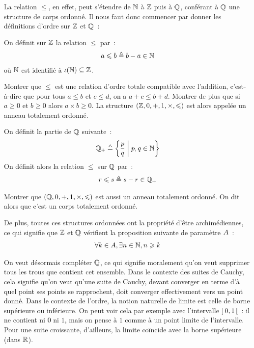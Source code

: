 La relation $\leq$, en effet, peut s'étendre de $\mathbb N$ à $\mathbb Z$ puis à $\mathbb Q$,
conférant à $\mathbb Q$ une structure de corps ordonné. Il nous faut donc commencer
par donner les définitions d'ordre sur $\mathbb Z$ et $\mathbb Q$~:

\begin{definition}
  On définit sur $\mathbb Z$ la relation $\leq$ par~:
  \[a \leqslant b \triangleq b - a \in \mathbb N\]
  où $\mathbb N$ est identifié à $\iota(\mathbb N) \subseteq \mathbb Z$.
\end{definition}

\begin{exercise}
  Montrer que $\leq$ est une relation d'ordre totale compatible avec l'addition,
  c'est-à-dire que pour tous $a\leq b$ et $c\leq d$, on a $a+c\leq b+d$.
  Montrer de plus que si $a \geq 0$ et $b\geq 0$ alors $a\times b \geq 0$.
  La structure $(\mathbb Z,0,+,1,\times,\leqslant)$ est alors appelée un anneau
  totalement ordonné.
\end{exercise}

\begin{definition}
  On définit la partie de $\mathbb Q$ suivante~:
  \[\mathbb Q_+ \triangleq \left\{ \frac{p}{q} \;\middle\vert\; p,q\in \mathbb N \right\}\]
  On définit alors la relation $\leq$ sur $\mathbb Q$ par~:
  \[r \leqslant s \triangleq s - r \in \mathbb Q_+\]
\end{definition}

\begin{exercise}
  Montrer que $(\mathbb Q,0,+,1,\times,\leqslant)$ est aussi un anneau totalement
  ordonné. On dit alors que c'est un corps totalement ordonné.
\end{exercise}

De plus, toutes ces structures ordonnées ont la propriété d'être archimédiennes,
ce qui signifie que $\mathbb Z$ et $\mathbb Q$ vérifient la proposition
suivante de paramètre $A$~:
\[\forall k\in A, \exists n \in\mathbb N, n \geqslant k\]

On veut désormais compléter $\mathbb Q$, ce qui signifie moralement qu'on veut
supprimer tous les trous que contient cet ensemble. Dans le contexte des suites
de Cauchy, cela signifie qu'on veut qu'une suite de Cauchy, devant converger en
terme d'à quel point ses points se rapprochent, doit converger effectivement
vers un point donné. Dans le contexte de l'ordre, la notion naturelle de limite
est celle de borne supérieure ou inférieure. On peut voir cela par exemple avec
l'intervalle $\mathord{\left]\,0,1\,\right[}$~: il ne contient ni $0$ ni $1$, mais on pense à
$1$ comme à un point limite de l'intervalle. Pour une suite croissante,
d'ailleurs, la limite coïncide avec la borne supérieure (dans $\mathbb R$).

